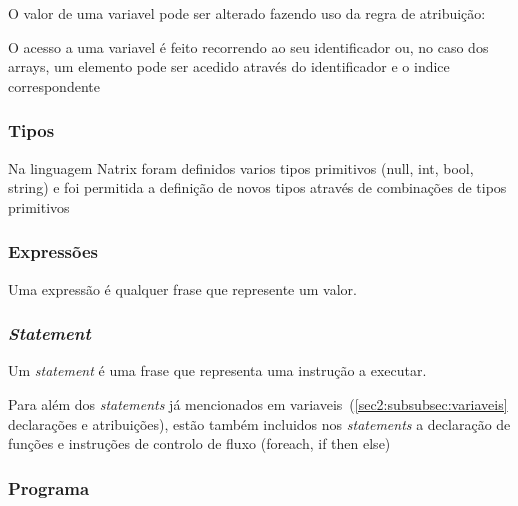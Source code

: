 O valor de uma variavel pode ser alterado fazendo uso da regra de atribuição:



O acesso a uma variavel é feito recorrendo ao seu identificador ou, no caso dos arrays, um elemento pode ser acedido através do identificador e o indice correspondente




\subsubsection{Tipos}

Na linguagem Natrix foram definidos varios tipos primitivos (null, int, bool, string) e foi permitida a definição de novos tipos através de combinações de tipos primitivos



\subsubsection{Expressões}

Uma expressão é qualquer frase que represente um valor.


\clearpage

\subsubsection{\textit{Statement}}

Um \textit{statement} é uma frase que representa uma instrução a executar.

Para além dos \textit{statements} já mencionados em variaveis~(\ref{sec2:subsubsec:variaveis} declarações e atribuições), estão também incluidos nos \textit{statements} a declaração de funções e instruções de controlo de fluxo (foreach, if then else)



\subsubsection{Programa}

